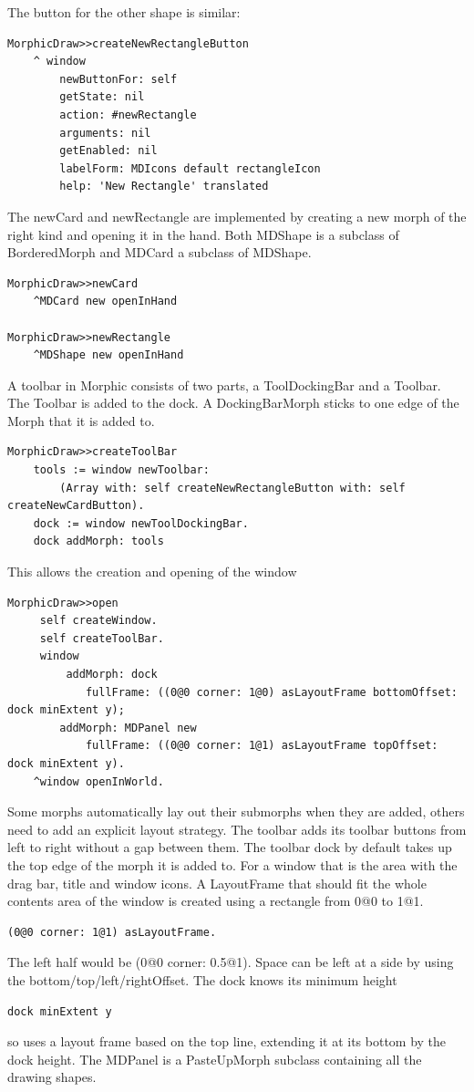 \documentclass[10pt]{article}   	%
\begin{document}
The button for the other shape is similar:
\begin{verbatim}
MorphicDraw>>createNewRectangleButton
    ^ window
        newButtonFor: self
        getState: nil
        action: #newRectangle
        arguments: nil
        getEnabled: nil
        labelForm: MDIcons default rectangleIcon
        help: 'New Rectangle' translated
\end{verbatim}

The newCard and newRectangle are implemented by creating a
new morph of the right kind and opening it in the hand. Both MDShape is a
subclass of BorderedMorph and MDCard a subclass of MDShape.

\begin{verbatim}
MorphicDraw>>newCard
    ^MDCard new openInHand

MorphicDraw>>newRectangle
    ^MDShape new openInHand
\end{verbatim}

A toolbar in Morphic consists of two parts, a ToolDockingBar and
a Toolbar. The Toolbar is added to the dock. A DockingBarMorph 
sticks to one edge of the Morph that it is added to.

\begin{verbatim}
MorphicDraw>>createToolBar
    tools := window newToolbar: 
        (Array with: self createNewRectangleButton with: self createNewCardButton).
    dock := window newToolDockingBar.
    dock addMorph: tools
\end{verbatim}
This allows the creation and opening of the window
\begin{verbatim}
MorphicDraw>>open
     self createWindow.
     self createToolBar.
     window
         addMorph: dock
            fullFrame: ((0@0 corner: 1@0) asLayoutFrame bottomOffset: dock minExtent y);
        addMorph: MDPanel new 			
            fullFrame: ((0@0 corner: 1@1) asLayoutFrame topOffset: dock minExtent y).
    ^window openInWorld.
\end{verbatim}
Some morphs automatically lay out their submorphs when they are added,
others need to add an explicit layout strategy. The toolbar adds its toolbar buttons
from left to right without a gap between them.  
The toolbar dock by default takes up the top edge of the morph it is added to. 
For a window that is the area with the drag bar, title and window icons. 
A LayoutFrame that should fit the whole contents area of the window is
created using a rectangle from 0@0 to 1@1.
\begin{verbatim}
(0@0 corner: 1@1) asLayoutFrame.   
\end{verbatim}
The left half would be (0@0 corner: 0.5@1).
Space can be left at a side by using the bottom/top/left/rightOffset.
The dock knows its minimum height
\begin{verbatim}
dock minExtent y
\end{verbatim}
so uses a layout frame based on the top line, extending it at its bottom
by the dock height. The MDPanel is a PasteUpMorph subclass containing
all the drawing shapes.
\end{document}
